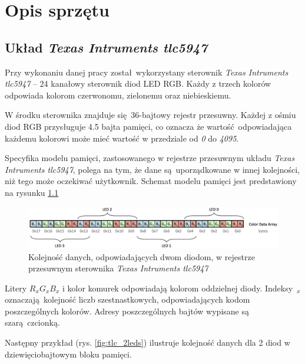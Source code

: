 \documentclass[eng,printmode]{mgr}
\begin{document}
\chapter{Opis sprzętu}

\section{Układ \emph{Texas Intruments tlc5947}}
Przy wykonaniu danej pracy został wykorzystany sterownik \emph{Texas Intruments tlc5947} -- 24 kanałowy sterownik diod LED RGB\cite{tlcDoc}. Każdy z trzech kolorów odpowiada kolorom czerwonomu, zielonemu oraz niebieskiemu.

W środku sterownika znajduje się 36-bajtowy rejestr przesuwny. Każdej z ośmiu diod RGB przysługuje 4.5 bajta pamięci, co oznacza że wartość odpowiadająca każdemu kolorowi może mieć wartość w przedziale od \emph{0} do \emph{4095}\cite{tlcDoc}. 

Specyfika modelu pamięci, zastosowanego w rejestrze przesuwnym układu \emph{Texas Intruments tlc5947}, polega na tym, że dane są uporządkowane w innej kolejności, niż tego może oczekiwać użytkownik. Schemat modelu pamięci jest predstawiony na rysunku \ref{fig:tlc_array}

\begin{figure}[!ht]
    \centering
    \includegraphics[width=\textwidth]{Figures/tlc_array.png} 
    \caption{Kolejność danych, odpowiadających dwom diodom, w rejestrze przesuwnym sterownika \emph{Texas Intruments tlc5947}}
    \label{fig:tlc_array}
\end{figure}

Litery $R_x G_x B_x$ i kolor komurek odpowiadają kolorom oddzielnej diody. Indeksy~$_x$ oznaczają kolejność liczb szestnastkowych, odpowiadających kodom poszczególnych kolorów. Adresy poszczególnych bajtów wypisane są szarą czcionką. 

Następny przykład (rys. \ref{fig:tlc_2leds}) ilustruje kolejność danych dla 2 diod w dziewięciobajtowym bloku pamięci.
\end{document}
